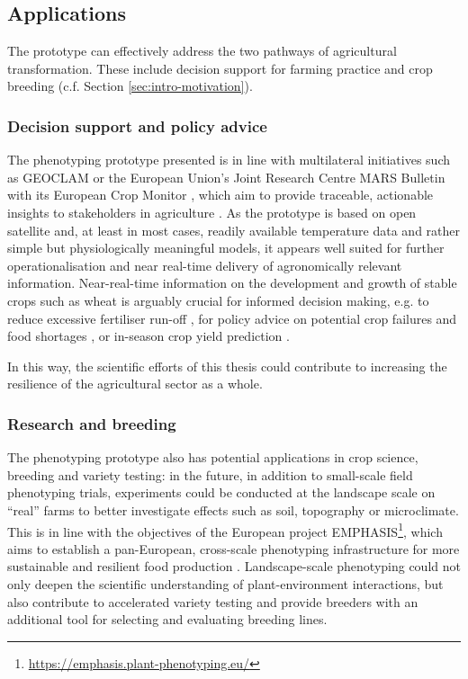 \subsection{Applications}
The prototype can effectively address the two pathways of agricultural transformation. These include decision support for farming practice and crop breeding (c.f. Section \ref{sec:intro-motivation}).

\subsubsection{Decision support and policy advice}
The phenotyping prototype presented is in line with multilateral initiatives such as \gls{GEOCLAM} or the European Union's Joint Research Centre MARS Bulletin with its European Crop Monitor \citep{van_der_velde_use_2019}, which aim to provide traceable, actionable insights to stakeholders in agriculture \citep{whitcraft_no_2019}. As the prototype is based on open satellite and, at least in most cases, readily available temperature data and rather simple but physiologically meaningful models, it appears well suited for further operationalisation and near real-time delivery of agronomically relevant information. Near-real-time information on the development and growth of stable crops such as wheat is arguably crucial for informed decision making, e.g. to reduce excessive fertiliser run-off \citep{argento_linking_2022}, for policy advice on potential crop failures and food shortages \citep{becker-reshef_strengthening_2020}, or in-season crop yield prediction \citep{amin_-season_2024}.

In this way, the scientific efforts of this thesis could contribute to increasing the resilience of the agricultural sector as a whole.

\subsubsection{Research and breeding}
The phenotyping prototype also has potential applications in crop science, breeding and variety testing: in the future, in addition to small-scale field phenotyping trials, experiments could be conducted at the landscape scale on ``real'' farms to better investigate effects such as soil, topography or microclimate. This is in line with the objectives of the European project EMPHASIS\footnote{\url{https://emphasis.plant-phenotyping.eu/}}, which aims to establish a pan-European, cross-scale phenotyping infrastructure for more sustainable and resilient food production \citep{pieruschka_plant_2019}. Landscape-scale phenotyping could not only deepen the scientific understanding of plant-environment interactions, but also contribute to accelerated variety testing and provide breeders with an additional tool for selecting and evaluating breeding lines.

